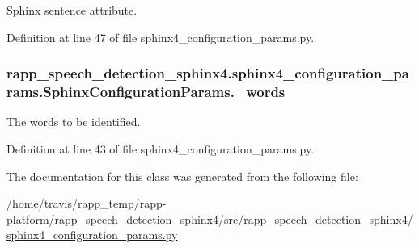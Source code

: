 Sphinx sentence attribute. 



Definition at line 47 of file sphinx4\-\_\-configuration\-\_\-params.\-py.

\hypertarget{classrapp__speech__detection__sphinx4_1_1sphinx4__configuration__params_1_1SphinxConfigurationParams_a668f07761930a1858db80c5711f3c84d}{
\subsubsection[{\-\_\-words}]{\setlength{\rightskip}{0pt plus 5cm}rapp\-\_\-speech\-\_\-detection\-\_\-sphinx4.\-sphinx4\-\_\-configuration\-\_\-params.\-Sphinx\-Configuration\-Params.\-\_\-words\hspace{0.3cm}{\ttfamily [private]}}}\label{classrapp__speech__detection__sphinx4_1_1sphinx4__configuration__params_1_1SphinxConfigurationParams_a668f07761930a1858db80c5711f3c84d}


The words to be identified. 



Definition at line 43 of file sphinx4\-\_\-configuration\-\_\-params.\-py.



The documentation for this class was generated from the following file\-:\begin{DoxyCompactItemize}
\item 
/home/travis/rapp\-\_\-temp/rapp-\/platform/rapp\-\_\-speech\-\_\-detection\-\_\-sphinx4/src/rapp\-\_\-speech\-\_\-detection\-\_\-sphinx4/\hyperlink{sphinx4__configuration__params_8py}{sphinx4\-\_\-configuration\-\_\-params.\-py}\end{DoxyCompactItemize}
